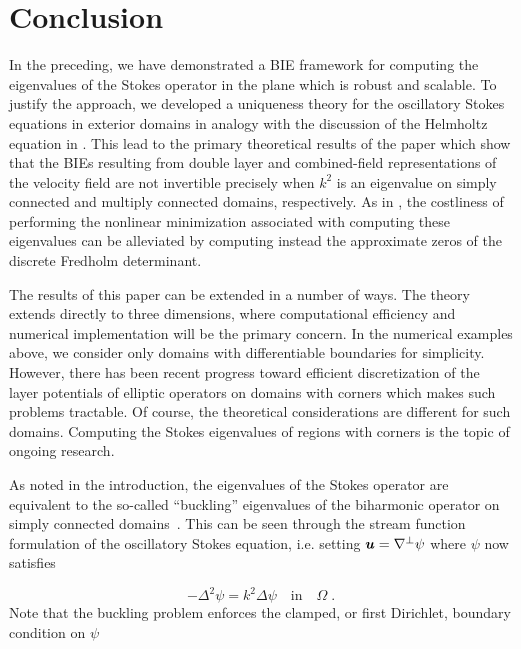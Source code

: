 \section{Conclusion}
\label{sec:conclusion}

In the preceding, we have demonstrated a
BIE framework for computing the eigenvalues
of the Stokes operator in the plane which
is robust and scalable.
%
To justify the
approach, we developed a uniqueness theory
for the oscillatory Stokes equations in
exterior domains in analogy with the
discussion of the Helmholtz equation in
\cite{colton1983integral}.
%
This lead to the primary theoretical
results of the paper which show that the
BIEs resulting from double layer and
combined-field representations of the
velocity field are 
not invertible precisely when $k^2$ is
an eigenvalue on simply connected
and multiply connected domains, respectively.
%
As in \cite{zhao2015robust}, the costliness
of performing the nonlinear minimization
associated with computing these eigenvalues
can be alleviated by computing instead the
approximate zeros of the discrete Fredholm
determinant.

The results of this paper can be
extended in a number of ways.
%
The theory
extends directly to three dimensions, where
computational efficiency and numerical
implementation will be the primary concern.
%
In the numerical examples above, we
consider only domains with differentiable
boundaries for simplicity.
%
However, there has been recent progress
toward efficient discretization of the
layer potentials of elliptic operators
on domains with corners
\cite{helsing2008corner,serkh2016solution,rachh2017solution,helsing2018integral}
which makes such problems tractable.
%
Of course, the theoretical considerations
are different for such domains.
%
Computing the Stokes eigenvalues of regions
with corners is the topic of ongoing
research.

As noted in the introduction, the
eigenvalues of the Stokes operator are
equivalent to the so-called
``buckling'' eigenvalues of the
biharmonic operator on simply connected
domains~\cite{kelliher2009eigenvalues}.
%
This can be seen through the stream function
formulation  of the oscillatory Stokes
equation, i.e. setting ${\boldsymbol u} = \nabla^\perp \psi$
where $\psi$ now satisfies

\begin{equation*}
  -\Delta^2 \psi = k^2 \Delta \psi \quad \textrm{in} \quad \Omega\; .
\end{equation*}
Note that the buckling problem enforces the
clamped, or first Dirichlet, boundary
condition on $\psi$

